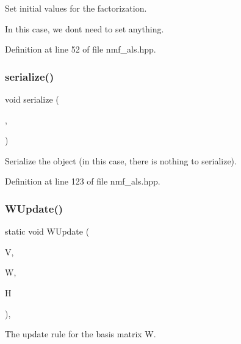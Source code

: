 Set initial values for the factorization. 

In this case, we don\textquotesingle{}t need to set anything. 

Definition at line 52 of file nmf\+\_\+als.\+hpp.

\mbox{\label{classmlpack_1_1amf_1_1NMFALSUpdate_aa2ccb5a0533a6ba0abe6dfc1f98fbafb}} 
\subsubsection{serialize()}
{\footnotesize\ttfamily void serialize (\begin{DoxyParamCaption}\item[{Archive \&}]{,  }\item[{const uint32\+\_\+t}]{ }\end{DoxyParamCaption})\hspace{0.3cm}{\ttfamily [inline]}}



Serialize the object (in this case, there is nothing to serialize). 



Definition at line 123 of file nmf\+\_\+als.\+hpp.

\mbox{\label{classmlpack_1_1amf_1_1NMFALSUpdate_a79b17bfdd69326a4f9f7d17c698ee6af}} 
\subsubsection{W\+Update()}
{\footnotesize\ttfamily static void W\+Update (\begin{DoxyParamCaption}\item[{const Mat\+Type \&}]{V,  }\item[{arma\+::mat \&}]{W,  }\item[{const arma\+::mat \&}]{H }\end{DoxyParamCaption})\hspace{0.3cm}{\ttfamily [inline]}, {\ttfamily [static]}}



The update rule for the basis matrix W. 

